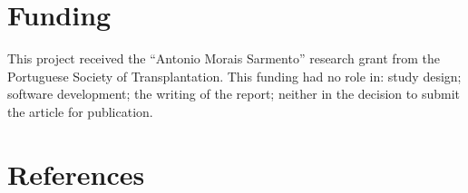 \documentclass[
]{article}
\begin{document}
\hypertarget{funding}{%
\section{Funding}\label{funding}}

This project received the ``Antonio Morais Sarmento'' research grant
from the Portuguese Society of Transplantation. This funding had no role
in: study design; software development; the writing of the report;
neither in the decision to submit the article for publication.

\hypertarget{references}{%
\section*{References}\label{references}}
\end{document}

